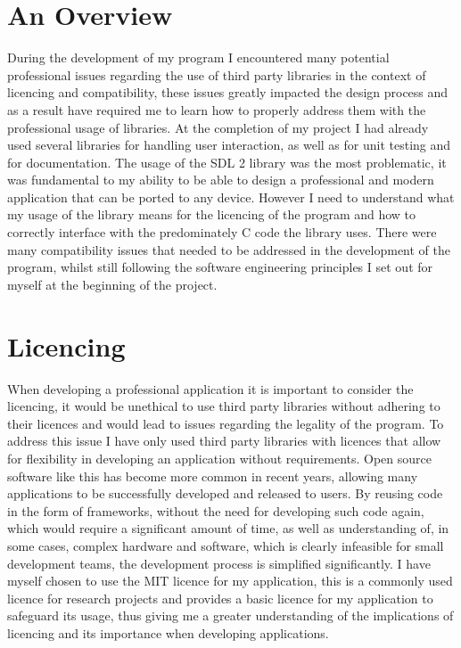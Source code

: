 \documentclass[]{final_report}
\begin{document}
\section*{An Overview}

During the development of my program I encountered many potential professional issues regarding the use of third party libraries in the context of licencing and compatibility, these issues greatly impacted the design process and as a result have required me to learn how to properly address them with the professional usage of libraries. At the completion of my project I had already used several libraries for handling user interaction, as well as for unit testing and for documentation. The usage of the SDL 2 library was the most problematic, it was fundamental to my ability to be able to design a professional and modern application that can be ported to any device. However I need to understand what my usage of the library means for the licencing of the program and how to correctly interface with the predominately C code the library uses. There were many compatibility issues that needed to be addressed in the development of the program, whilst still following the software engineering principles I set out for myself at the beginning of the project.

\section*{Licencing}

When developing a professional application it is important to consider the licencing, it would be unethical to use third party libraries without adhering to their licences and would lead to issues regarding the legality of the program. To address this issue I have only used third party libraries with licences that allow for flexibility in developing an application without requirements. Open source software like this has become more common in recent years, allowing many applications to be successfully developed and released to users. By reusing code in the form of frameworks, without the need for developing such code again, which would require a significant amount of time, as well as understanding of, in some cases, complex hardware and software, which is clearly infeasible for small development teams, the development process is simplified significantly. I have myself chosen to use the MIT licence for my application, this is a commonly used licence for research projects and provides a basic licence for my application to safeguard its usage, thus giving me a greater understanding of the implications of licencing and its importance when developing applications.
\end{document}
